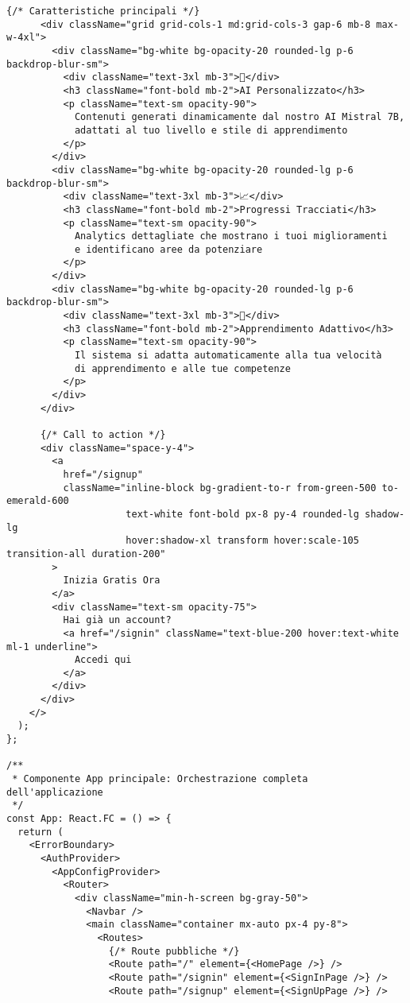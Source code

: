 \documentclass[a4paper, 14pt, oneside]{extbook}
\begin{document}
\begin{lstlisting}[style=javascriptstyle, caption=Componente App React - Orchestrazione Intelligente, label=lst:app-component]
      {/* Caratteristiche principali */}
      <div className="grid grid-cols-1 md:grid-cols-3 gap-6 mb-8 max-w-4xl">
        <div className="bg-white bg-opacity-20 rounded-lg p-6 backdrop-blur-sm">
          <div className="text-3xl mb-3">🤖</div>
          <h3 className="font-bold mb-2">AI Personalizzato</h3>
          <p className="text-sm opacity-90">
            Contenuti generati dinamicamente dal nostro AI Mistral 7B, 
            adattati al tuo livello e stile di apprendimento
          </p>
        </div>
        <div className="bg-white bg-opacity-20 rounded-lg p-6 backdrop-blur-sm">
          <div className="text-3xl mb-3">📈</div>
          <h3 className="font-bold mb-2">Progressi Tracciati</h3>
          <p className="text-sm opacity-90">
            Analytics dettagliate che mostrano i tuoi miglioramenti 
            e identificano aree da potenziare
          </p>
        </div>
        <div className="bg-white bg-opacity-20 rounded-lg p-6 backdrop-blur-sm">
          <div className="text-3xl mb-3">🎯</div>
          <h3 className="font-bold mb-2">Apprendimento Adattivo</h3>
          <p className="text-sm opacity-90">
            Il sistema si adatta automaticamente alla tua velocità 
            di apprendimento e alle tue competenze
          </p>
        </div>
      </div>

      {/* Call to action */}
      <div className="space-y-4">
        <a
          href="/signup"
          className="inline-block bg-gradient-to-r from-green-500 to-emerald-600 
                     text-white font-bold px-8 py-4 rounded-lg shadow-lg 
                     hover:shadow-xl transform hover:scale-105 transition-all duration-200"
        >
          Inizia Gratis Ora
        </a>
        <div className="text-sm opacity-75">
          Hai già un account? 
          <a href="/signin" className="text-blue-200 hover:text-white ml-1 underline">
            Accedi qui
          </a>
        </div>
      </div>
    </>
  );
};

/**
 * Componente App principale: Orchestrazione completa dell'applicazione
 */
const App: React.FC = () => {
  return (
    <ErrorBoundary>
      <AuthProvider>
        <AppConfigProvider>
          <Router>
            <div className="min-h-screen bg-gray-50">
              <Navbar />
              <main className="container mx-auto px-4 py-8">
                <Routes>
                  {/* Route pubbliche */}
                  <Route path="/" element={<HomePage />} />
                  <Route path="/signin" element={<SignInPage />} />
                  <Route path="/signup" element={<SignUpPage />} />
                  

\end{lstlisting}
\end{document}
